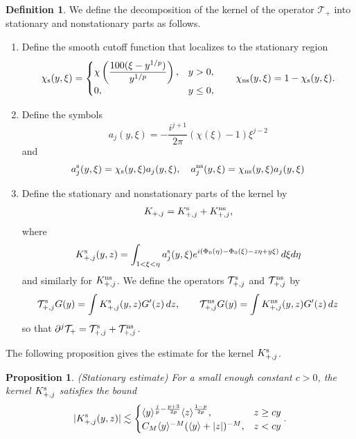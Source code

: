 \documentclass[11pt]{amsart}
\newtheorem{proposition}[theorem]{Proposition}
\theoremstyle{definition}
\newtheorem{definition}[theorem]{Definition}
\theoremstyle{remark}
\numberwithin{equation}{section}
\newcommand{\mc}[1]{\mathcal{#1}}
\newcommand{\ang}[1]{\langle #1 \rangle}
\begin{document}
\begin{definition}
    We define the decomposition of the kernel of the operator $\mc{T}_+$ into stationary and nonstationary parts as follows. 
    \begin{enumerate}
        \item Define the smooth cutoff function that localizes to the stationary region
        \begin{equation}\label{eqn:linear_stationary_cutoffs}\chi_{\textup{s}}(y,\xi) = \begin{cases}
            \chi\left(\dfrac{100(\xi - y^{1/p})}{y^{1/p}}\right), & y>0,\\
            0, & y\leq0,
        \end{cases}
        \qquad \chi_{\textup{ns}}(y,\xi)=1-\chi_{\textup{s}}(y,\xi).\end{equation}
        \item Define the symbols
        \[a_j(y, \xi) = -\frac{i^{j+1}}{2\pi}(\chi(\xi) - 1)\xi^{j-2}\]
        and
        \[a_j^{\textup{s}}(y, \xi) = \chi_{\textup{s}}(y,\xi)a_j(y,\xi), \quad a_j^{\textup{ns}}(y, \xi) = \chi_{\textup{ns}}(y,\xi)a_j(y,\xi)\]
        \item Define the stationary and nonstationary parts of the kernel by
        \begin{equation}\label{eqn:linear_stationary_kernel_split}K_{+,j} = K_{+,j}^{\textup{s}} + K_{+,j}^{\textup{ns}},\end{equation}
        where
        \[K_{+,j}^{\textup{s}}(y, z) = \int_{1 < \xi < \eta} a_j^{\textup{s}}(y, \xi) e^{i(\Phi_0(\eta) - \Phi_0(\xi) - z\eta + y\xi)} \, d\xi d\eta\]
        and similarly for $K_{+,j}^{\textup{ns}}$. We define the operators $\mc{T}_{+,j}^{\textup{s}}$ and $\mc{T}_{+,j}^{\textup{ns}}$ by
        \begin{equation}\label{eqn:linear_stationary_operators}\mc{T}_{+,j}^{\textup{s}}G(y)=\int K_{+,j}^{\textup{s}}(y,z)G'(z)\,dz,\qquad
        \mc{T}_{+,j}^{\textup{ns}}G(y)=\int K_{+,j}^{\textup{ns}}(y,z)G'(z)\,dz\end{equation}
        so that $\partial^j \mc{T}_+ = \mc{T}_{+,j}^{\textup{s}} + \mc{T}_{+,j}^{\textup{ns}}$.
    \end{enumerate}
\end{definition}

The following proposition gives the estimate for the kernel $K_{+,j}^{\textup{s}}$.

\begin{proposition}\label{prop:linear_stationary}(Stationary estimate)
    For a small enough constant $c > 0$, the kernel $K_{+,j}^{\textup{s}}$ satisfies the bound 
    \[|K_{+,j}^{\textup{s}}(y, z)| \lesssim \begin{cases}
        \ang{y}^{\frac{j}{p} - \frac{p + 3}{2p}} \ang{z}^{\frac{1 - p}{2p}}, & z \geq cy \\
        C_M\ang{y}^{-M}(\ang{y} + |z|)^{-M}, & z < cy
    \end{cases}.\]
\end{proposition}
\end{document}
